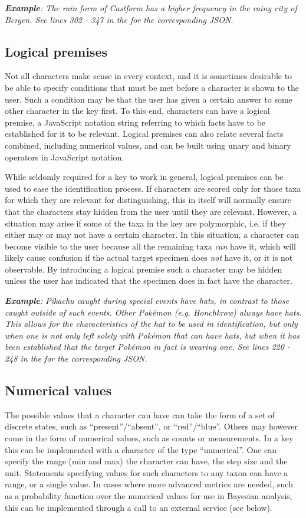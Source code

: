 \documentclass[10pt,letterpaper]{article}
\begin{document}
\textit{\textbf{Example}: The rain form of Castform has a higher frequency in the rainy city of Bergen. See lines 302 - 347 in the  for the corresponding JSON.}
\subsection*{
Logical premises
}
Not all characters make sense in every context, and it is sometimes desirable to be able to specify conditions that must be met before a character is shown to the user. Such a condition may be that the user has given a certain answer to some other character in the key first. To this end, characters can have a logical premise, a JavaScript notation string referring to which facts have to be established for it to be relevant. Logical premises can also relate several facts combined, including numerical values, and can be built using unary and binary operators in JavaScript notation.

While seldomly required for a key to work in general, logical premises can be used to ease the identification process. If characters are scored only for those taxa for which they are relevant for distinguishing, this in itself will normally ensure that the characters stay hidden from the user until they are relevant. However, a situation may arise if some of the taxa in the key are polymorphic, i.e. if they either may or may not have a certain character. In this situation, a character can become visible to the user because all the remaining taxa \textit{can} have it, which will likely cause confusion if the actual target specimen does \textit{not} have it, or it is not observable. By introducing a logical premise such a character may be hidden unless the user has indicated that the specimen does in fact have the character.

\textit{\textbf{Example}: Pikachu caught during special events have hats, in contrast to those caught outside of such events. Other Pokémon (e.g. Honchkrow) always have hats. This allows for the characteristics of the hat to be used in identification, but only when one is not only left solely with Pokémon that can have hats, but when it has been established that the target Pokémon in fact is wearing one. See lines 220 - 248 in the  for the corresponding JSON.}
\subsection*{
Numerical values
}
The possible values that a character can have can take the form of a set of discrete states, such as ``present''/``absent'', or ``red''/``blue''. Others may however come in the form of numerical values, such as counts or measurements. In a key this can be implemented with a character of the type ``numerical''. One can specify the range (min and max) the character can have, the step size and the unit. Statements specifying values for such characters to any taxon can have a range, or a single value. In cases where more advanced metrics are needed, such as a probability function over the numerical values for use in Bayesian analysis, this can be implemented through a call to an external service (see below).
\end{document}

